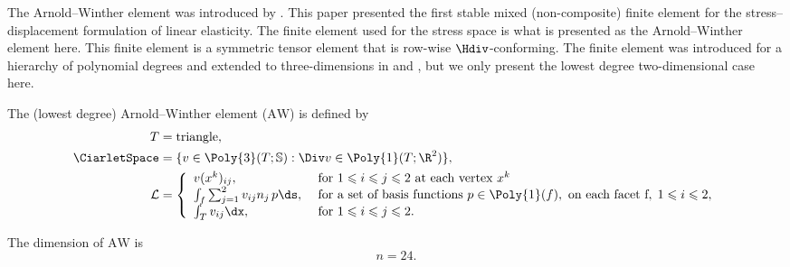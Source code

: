 The Arnold--Winther element was introduced
by \citet{ArnoldWinther2002}. This paper presented the first stable
mixed (non-composite) finite element for the stress--displacement
formulation of linear elasticity. The finite element used for the
stress space is what is presented as the Arnold--Winther element
here. This finite element is a symmetric tensor element that is
row-wise $\Hdiv$-conforming. The finite element was introduced for a
hierarchy of polynomial degrees and extended to \hbox{three-dimensions}
in \citet{AdamsCockburn2005} and \citet{ArnoldAwanouWinther2008}, but we
only present the lowest degree two-dimensional case here.

\begin{definition}
  The (lowest degree) Arnold--Winther element ($\mathrm{AW}$) is
  defined by
  \begin{align}
    T &= \mathrm{triangle}{},  \\
    \CiarletSpace &= \{ v \in \Poly{3}(T; \mathbb{S}) :
                     \Div v \in \Poly{1}(T; \R^2) \}, \\
    \mathcal{L} &=
    \left \{
    \begin{array}{ll}
      v(x^k)_{ij},  & \text{ for } 1 \leqslant i \leqslant j \leqslant 2
      \text{ at each vertex } x^k \\
      \int_{f} \sum_{j=1}^2 v_{ij} n_j \, p \ds,
      & \text{ for a set of basis functions } p \in \Poly{1}(f),
      \text{ on each facet } $f$, \; 1 \leqslant i \leqslant 2, \\
      \int_{T} v_{ij} \dx,
      & \text{ for } 1 \leqslant i \leqslant j \leqslant 2.
    \end{array}
    \right .
  \end{align}
\end{definition}
The dimension of $\mathrm{AW}$ is
\begin{equation}
  n = 24.
\end{equation}

